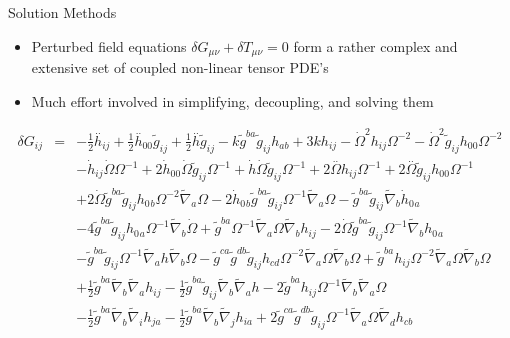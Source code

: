 \documentclass[8pt]{beamer}
\begin{document}
\begin{frame}{Solution Methods}
	\begin{itemize}
		\item Perturbed field equations $\delta G_{\mu\nu} + \delta T_{\mu\nu} = 0$ form a rather complex and extensive set of coupled non-linear tensor PDE's
		\item
		Much effort involved in simplifying, decoupling, and solving them
	\end{itemize}
	\begin{eqnarray*}
		\delta G_{ij} &=& - \tfrac{1}{2} \overset{..}{h}_{ij} + \tfrac{1}{2} \overset{..}{h}_{00}{} \tilde{g}_{ij} + \tfrac{1}{2} \overset{..}{h} \tilde{g}_{ij} -  k \tilde{g}^{ba} \tilde{g}_{ij} h_{ab} + 3 k h_{ij} -  \dot{\Omega}^2 h_{ij} \Omega^{-2} -  \dot{\Omega}^2 \tilde{g}_{ij} h_{00}{} \Omega^{-2} 
		\nonumber\\
		&& -  \dot{h}_{ij} \dot{\Omega} \Omega^{-1}  + 2 \dot{h}_{00}{} \dot{\Omega} \tilde{g}_{ij} \Omega^{-1} + \dot{h} \dot{\Omega} \tilde{g}_{ij} \Omega^{-1} + 2 \overset{..}{\Omega} h_{ij} \Omega^{-1} + 2 \overset{..}{\Omega} \tilde{g}_{ij} h_{00}{} \Omega^{-1} 
		\nonumber\\
		&& + 2 \dot{\Omega} \tilde{g}^{ba} \tilde{g}_{ij} h_{0}{}_{b} \Omega^{-2} \tilde{\nabla}_{a}\Omega  - 2 \dot{h}_{0}{}_{b} \tilde{g}^{ba} \tilde{g}_{ij} \Omega^{-1} \tilde{\nabla}_{a}\Omega -  \tilde{g}^{ba} \tilde{g}_{ij} \tilde{\nabla}_{b}\dot{h}_{0}{}_{a} 
		\nonumber\\
		&& - 4 \tilde{g}^{ba} \tilde{g}_{ij} h_{0}{}_{a} \Omega^{-1} \tilde{\nabla}_{b}\dot{\Omega} + \tilde{g}^{ba} \Omega^{-1} \tilde{\nabla}_{a}\Omega \tilde{\nabla}_{b}h_{ij} - 2 \dot{\Omega} \tilde{g}^{ba} \tilde{g}_{ij} \Omega^{-1} \tilde{\nabla}_{b}h_{0}{}_{a}
		\nonumber\\
		&&  -  \tilde{g}^{ba} \tilde{g}_{ij} \Omega^{-1} \tilde{\nabla}_{a}h \tilde{\nabla}_{b}\Omega -  \tilde{g}^{ca} \tilde{g}^{db} \tilde{g}_{ij} h_{cd} \Omega^{-2} \tilde{\nabla}_{a}\Omega \tilde{\nabla}_{b}\Omega  + \tilde{g}^{ba} h_{ij} \Omega^{-2} \tilde{\nabla}_{a}\Omega \tilde{\nabla}_{b}\Omega 
		\nonumber\\
		&&+ \tfrac{1}{2} \tilde{g}^{ba} \tilde{\nabla}_{b}\tilde{\nabla}_{a}h_{ij} -  \tfrac{1}{2} \tilde{g}^{ba} \tilde{g}_{ij} \tilde{\nabla}_{b}\tilde{\nabla}_{a}h - 2 \tilde{g}^{ba} h_{ij} \Omega^{-1} \tilde{\nabla}_{b}\tilde{\nabla}_{a}\Omega  
		\nonumber\\
		&& -  \tfrac{1}{2} \tilde{g}^{ba} \tilde{\nabla}_{b}\tilde{\nabla}_{i}h_{ja} -  \tfrac{1}{2} \tilde{g}^{ba} \tilde{\nabla}_{b}\tilde{\nabla}_{j}h_{ia} + 2 \tilde{g}^{ca} \tilde{g}^{db} \tilde{g}_{ij} \Omega^{-1} \tilde{\nabla}_{a}\Omega \tilde{\nabla}_{d}h_{cb} 

\end{eqnarray*}
\end{frame}
\end{document}
